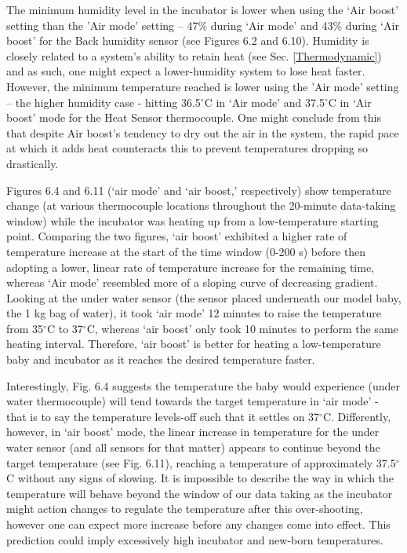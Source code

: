 \documentclass{article}
\begin{document}
  \vspace{3mm}


The minimum humidity level in the incubator is lower when using the ‘Air boost’ setting than the 'Air mode' setting – 47\% during ‘Air mode’ and 43\% during ‘Air boost’ for the Back humidity sensor (see Figures 6.2 and 6.10). Humidity is closely related to a system’s ability to retain heat (see Sec. \ref{Thermodynamic}) and as such, one might expect a lower-humidity system to lose heat faster. However, the minimum temperature reached is lower using the 'Air mode' setting – the higher humidity case - hitting 36.5$^{\circ}$C in ‘Air mode’ and 37.5$^{\circ}$C in ‘Air boost’ mode for the Heat Sensor thermocouple. One might conclude from this that despite Air boost’s tendency to dry out the air in the system, the rapid pace at which it adds heat counteracts this to prevent temperatures dropping so drastically.  

  \vspace{3mm}


Figures 6.4 and 6.11 (‘air mode’ and ‘air boost,’ respectively) show temperature change (at various thermocouple locations throughout the 20-minute data-taking window) while the incubator was heating up from a low-temperature starting point. Comparing the two figures, ‘air boost’ exhibited a higher rate of temperature increase at the start of the time window (0-200 s) before then adopting a lower, linear rate of temperature increase for the remaining time, whereas ‘Air mode’ resembled more of a sloping curve of decreasing gradient. Looking at the under water sensor (the sensor placed underneath our model baby, the 1 kg bag of water), it took ‘air mode’ 12 minutes to raise the temperature from 35$^{\circ}$C to 37$^{\circ}$C, whereas ‘air boost’ only took 10 minutes to perform the same heating interval. Therefore, ‘air boost’ is better for heating a low-temperature baby and incubator as it reaches the desired temperature faster. 

  \vspace{3mm}


Interestingly, Fig. 6.4 suggests the temperature the baby would experience (under water thermocouple) will tend towards the target temperature in ‘air mode’ - that is to say the temperature levels-off such that it settles on 37$^{\circ}$C. Differently, however, in ‘air boost’ mode, the linear increase in temperature for the under water sensor (and all sensors for that matter) appears to continue beyond the target temperature (see Fig. 6.11), reaching a temperature of approximately 37.5$^{\circ}$C without any signs of slowing. It is impossible to describe the way in which the temperature will behave beyond the window of our data taking as the incubator might action changes to regulate the temperature after this over-shooting, however one can expect more increase before any changes come into effect. This prediction could imply excessively high incubator and new-born temperatures.  
\end{document}
